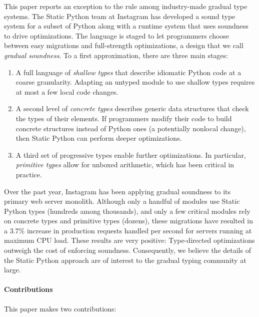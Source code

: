 \documentclass[english,cleveref,submission]{programming}
\newcommand{\SP}{Static Python}
\newcommand{\CPUchange}{3.7\%}
\begin{document}
This paper reports an exception to the rule among industry-made gradual type systems.
The \SP{} team at Instagram has developed a sound type system for a subset of
Python along with a runtime system that uses soundness to drive optimizations.
The language is staged to let programmers choose between easy migrations and
full-strength optimizations, a design that we call \emph{gradual soundness}.
To a first approximation, there are three main stages:
\begin{enumerate}
  \item
    A full language of \emph{shallow types\/} that describe idiomatic
    Python code at a coarse granularity.
    Adapting an untyped module to use shallow types requires at most a few local code
    changes.
  \item
    A second level of \emph{concrete types\/} describes generic data structures
    that check the types of their elements.
    If programmers modify their code to build concrete structures instead of Python
    ones (a potentially nonlocal change), then \SP{} can perform deeper optimizations.
  \item
    A third set of progressive types enable further optimizations.
    In particular, \emph{primitive types\/} allow for unboxed arithmetic,
    which has been critical in practice.
\end{enumerate}

Over the past year, Instagram has been applying gradual soundness to its
primary web server monolith.
Although only a handful of modules use \SP{} types (hundreds among thousands),
and only a few critical modules rely on concrete types and primitive types (dozens),
these migrations have resulted in a \CPUchange{} increase in production requests handled
per second for servers running at maximum CPU load.
These results are very positive:
Type-directed optimizations outweigh the cost of enforcing soundness.
Consequently, we believe the details of the \SP{} approach are of interest to
the gradual typing community at large.


\paragraph*{Contributions}
This paper makes two contributions:
\end{document}
